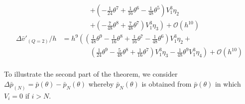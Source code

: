 \begin{align*}
                              & \qquad\qquad \left. + \left(-\frac{1}{24} \theta^{7} + \frac{1}{16} \theta^{6} - \frac{1}{48} \theta^{5}\right) V_{1}^{3} \eta_{2} \right.                                                                                               \\
                              & \qquad\qquad \left. + \left(-\frac{7}{48} \theta^{8} + \frac{7}{48} \theta^{7}\right) V_{1}^{3} \eta_{3}\right) + \mathcal{O}(h^{10})                                                                                                    \\
    \Delta \bar{v}'_{(Q=2)}/h & = h^{9}\left(\left(\frac{1}{48} \theta^{9} - \frac{1}{16} \theta^{8} + \frac{1}{16} \theta^{7} - \frac{1}{48} \theta^{6}\right) V_{1}^{3} \eta_{2} + \right.                                                                             \\
                              & \qquad\qquad \left. \left(\frac{1}{24} \theta^{9} - \frac{5}{48} \theta^{8} + \frac{1}{16} \theta^{7}\right) V_{1}^{3} \eta_{3} -\frac{1}{48} \theta^{9} V_{1}^{3} \eta_{4}\right) + \mathcal{O}(h^{10})                                 \\
\end{align*}

To illustrate the second part of the theorem, we consider $\Delta \bar{p}_{(N)} = \bar{p}(\theta) - \bar{p}_N(\theta)$  whereby $\bar{p}_N(\theta)$ is obtained from
$\bar{p}(\theta)$ in which $V_i = 0$ if $i > N$.

